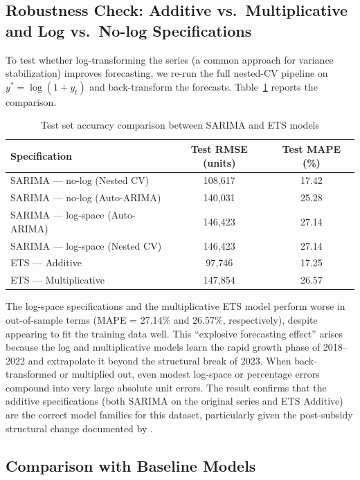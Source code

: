 \documentclass[12pt]{article}
\begin{document}
\subsection{Robustness Check: Additive vs.\ Multiplicative and Log vs.\ No-log Specifications}
\label{sec:robust}

To test whether log-transforming the series (a common approach for variance stabilization) improves forecasting, we re-run the full nested-CV pipeline on $y^* = \log(1 + y_t)$ and back-transform the forecasts. Table~\ref{tab:log} reports the comparison.

\begin{table}[H]
\centering
\caption{Test set accuracy comparison between SARIMA and ETS models}
\label{tab:log}
\begin{tabular}{lcc}
\toprule
Specification & Test RMSE (units) & Test MAPE (\%) \\
\midrule
SARIMA --- no-log (Nested CV) & 108,617 & 17.42 \\
SARIMA --- no-log (Auto-ARIMA) & 140,031 & 25.28 \\
SARIMA --- log-space (Auto-ARIMA) & 146,423 & 27.14 \\
SARIMA --- log-space (Nested CV) & 146,423 & 27.14 \\
ETS --- Additive & 97,746 & 17.25 \\
ETS --- Multiplicative & 147,854 & 26.57 \\
\bottomrule
\end{tabular}
\end{table}

The log-space specifications and the multiplicative ETS model perform worse in out-of-sample terms (MAPE = 27.14\% and 26.57\%, respectively), despite appearing to fit the training data well. This ``explosive forecasting effect'' arises because the log and multiplicative models learn the rapid growth phase of 2018--2022 and extrapolate it beyond the structural break of 2023. When back-transformed or multiplied out, even modest log-space or percentage errors compound into very large absolute unit errors. The result confirms that the additive specifications (both SARIMA on the original series and ETS Additive) are the correct model families for this dataset, particularly given the post-subsidy structural change documented by \citet{chen2025}.

\subsection{Comparison with Baseline Models}
\end{document}
